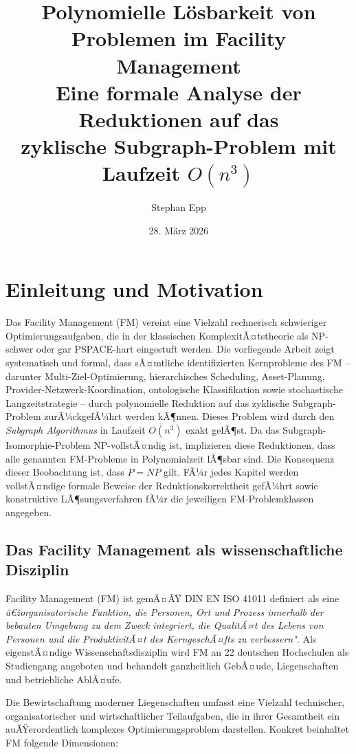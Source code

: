 ﻿\documentclass[a4paper,12pt]{article}
\title{\textbf{Polynomielle L\"osbarkeit von\\
Problemen im Facility Management}\\[0.5em]
\large Eine formale Analyse der Reduktionen auf das\\
zyklische Subgraph-Problem mit Laufzeit $O(n^3)$}
\author{Stephan Epp}
\date{28. M\"arz 2026}
\theoremstyle{definition}
\begin{document}
\maketitle
\tableofcontents
\newpage

\section{Einleitung und Motivation}
Das Facility Management (FM) vereint eine Vielzahl rechnerisch schwieriger Optimierungsaufgaben,
die in der klassischen KomplexitÃ¤tstheorie als NP-schwer oder gar PSPACE-hart eingestuft werden.
Die vorliegende Arbeit zeigt systematisch und formal, dass sÃ¤mtliche identifizierten
Kernprobleme des FM -- darunter Multi-Ziel-Optimierung, hierarchisches Scheduling, Asset-Planung,
Provider-Netzwerk-Koordination, ontologische Klassifikation sowie stochastische Langzeitstrategie
-- durch polynomielle Reduktion auf das zyklische Subgraph-Problem zurÃ¼ckgefÃ¼hrt werden kÃ¶nnen.
Dieses Problem wird durch den \emph{Subgraph Algorithmus} in Laufzeit $O(n^3)$ exakt gelÃ¶st.
Da das Subgraph-Isomorphie-Problem NP-vollstÃ¤ndig ist, implizieren diese Reduktionen,
dass alle genannten FM-Probleme in Polynomialzeit lÃ¶sbar sind.
Die Konsequenz dieser Beobachtung ist, dass $P = NP$ gilt.
FÃ¼r jedes Kapitel werden vollstÃ¤ndige formale Beweise der Reduktionskorrektheit gefÃ¼hrt
sowie konstruktive LÃ¶sungsverfahren fÃ¼r die jeweiligen FM-Problemklassen angegeben.

\subsection{Das Facility Management als wissenschaftliche Disziplin}

Facility Management (FM) ist gemÃ¤ÃŸ DIN EN ISO 41011 definiert als eine
\emph{â€žorganisatorische Funktion, die Personen, Ort und Prozess innerhalb der bebauten
Umgebung zu dem Zweck integriert, die QualitÃ¤t des Lebens von Personen und die
ProduktivitÃ¤t des KerngeschÃ¤fts zu verbessern"}.
Als eigenstÃ¤ndige Wissenschaftsdisziplin wird FM an 22 deutschen Hochschulen als
Studiengang angeboten und behandelt ganzheitlich GebÃ¤ude, Liegenschaften und betriebliche AblÃ¤ufe.

Die Bewirtschaftung moderner Liegenschaften umfasst eine Vielzahl technischer,
organisatorischer und wirtschaftlicher Teilaufgaben, die in ihrer Gesamtheit
ein auÃŸerordentlich komplexes Optimierungsproblem darstellen.
Konkret beinhaltet FM folgende Dimensionen:
\end{document}
